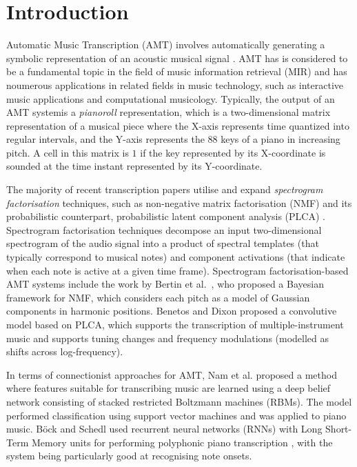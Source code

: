 \section{Introduction} 
\label{sec:introduction}

Automatic Music Transcription (AMT) involves automatically generating a symbolic representation of an acoustic musical signal \cite{Benetos2013b}. AMT has is considered to be a fundamental topic in the field of music information retrieval (MIR) and has noumerous applications in related fields in music technology, such as interactive music applications and computational musicology. Typically, the output of an AMT systemis a \textit{pianoroll} representation, which is a two-dimensional matrix representation of a musical piece where the X-axis represents time quantized into regular intervals, and the Y-axis represents the $88$ keys of a piano in increasing pitch. A cell in this matrix is $1$ if the key represented by its X-coordinate is sounded at the time instant represented by its Y-coordinate.

The majority of recent transcription papers utilise and expand \emph{spectrogram factorisation} techniques, such as non-negative matrix factorisation (NMF) \cite{Li1999} and its probabilistic counterpart, probabilistic latent component analysis (PLCA) \cite{Smaragdis2006}. Spectrogram factorisation techniques decompose an input two-dimensional spectrogram of the audio signal into a product of spectral templates (that typically correspond to musical notes) and component activations (that indicate when each note is active at a given time frame). Spectrogram factorisation-based AMT systems include the work by Bertin et al.\ \cite{Bertin2009}, who proposed a Bayesian framework for NMF, which considers each pitch as a model of Gaussian components in harmonic positions. Benetos and Dixon \cite{Benetos2012} proposed a convolutive model based on PLCA, which supports the transcription of multiple-instrument music and supports tuning changes and frequency modulations (modelled as shifts across log-frequency). 

In terms of connectionist approaches for AMT, Nam et al. \cite{Nam2011} proposed a method where features suitable for transcribing music are learned using a deep belief network consisting of stacked restricted Boltzmann machines (RBMs). The model performed classification using support vector machines and was applied to piano music. B\"{o}ck and Schedl used recurrent neural networks (RNNs) with Long Short-Term Memory units for performing polyphonic piano transcription \cite{Bock2012}, with the system being particularly good at recognising note onsets. 

